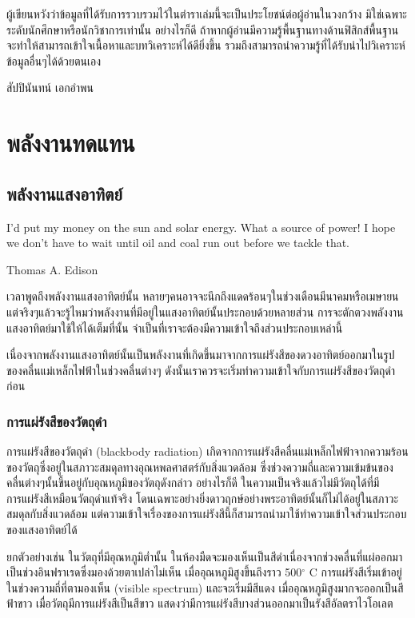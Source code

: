 \documentclass[a4paper,nobib,openany]{tufte-book}
\begin{document}
ผู้เขียนหวังว่าข้อมูลที่ได้รับการรวบรวมไว้ในตำราเล่มนี้จะเป็นประโยชน์ต่อผู้อ่านในวงกว้าง
มิใช่เฉพาะระดับนักศึกษาหรือนักวิชาการเท่านั้น อย่างไรก็ดี
ถ้าหากผู้อ่านมีความรู้พื้นฐานทางด้านฟิสิกส์พื้นฐาน
จะทำให้สามารถเข้าใจเนื้อหาและบทวิเคราะห์ได้ดียิ่งขึ้น
รวมถึงสามารถนำความรู้ที่ได้รับนำไปวิเคราะห์ข้อมูลอื่นๆได้ด้วยตนเอง

สัปปินันทน์ เอกอำพน

\listoffigures

\listoftables

\mainmatter


\part{พลังงานทดแทน}
\label{sec:org705d36b}
\chapter{พลังงานแสงอาทิตย์}
\label{sec:org5cc2bc5}

\epigraph{I'd put my money on the sun and solar energy. What a source of power! I hope we don't have to wait until oil and coal run out before we tackle that.}{Thomas A. Edison}

เวลาพูดถึงพลังงานแสงอาทิตย์นั้น
หลายๆคนอาจจะนึกถึงแดดร้อนๆในช่วงเดือนมีนาคมหรือเมษายน
แต่จริงๆแล้วจะรู้ไหมว่าพลังงานที่มีอยู่ในแสงอาทิตย์นั้นประกอบด้วยหลายส่วน
การจะตักตวงพลังงานแสงอาทิตย์มาใช้ให้ได้เต็มที่นั้น
จำเป็นที่เราจะต้องมีความเข้าใจถึงส่วนประกอบเหล่านี้

เนื่องจากพลังงานแสงอาทิตย์นั้นเป็นพลังงานที่เกิดขึ้นมาจากการแผ่รังสีของดวงอาทิตย์ออกมาในรูปของคลื่นแม่เหล็กไฟฟ้าในช่วงคลื่นต่างๆ
ดังนั้นเราควรจะเริ่มทำความเข้าใจกับการแผ่รังสีของวัตถุดำก่อน

\section{การแผ่รังสีของวัตถุดำ}
\label{sec:orgad093a3}
การแผ่รังสีของวัตถุดำ (blackbody radiation) เกิดจากการแผ่รังสีคลื่นแม่เหล็กไฟฟ้าจากความร้อนของวัตถุซึ่งอยู่ในสภาวะสมดุลทางอุณหพลศาสตร์กับสิ่งแวดล้อม
ซึ่งช่วงความถี่และความเข้มข้นของคลื่นต่างๆนั้นขึ้นอยู่กับอุณหภูมิของวัตถุดังกล่าว
อย่างไรก็ดี
ในความเป็นจริงแล้วไม่มีวัตถุได้ที่มีการแผ่รังสีเหมือนวัตถุดำแท้จริง
โดนเฉพาะอย่างยิ่งดาวฤกษ์อย่างพระอาทิตย์นั้นก็ไม่ได้อยู่ในสภาวะสมดุลกับสิ่งแวดล้อม
แต่ความเข้าใจเรื่องของการแผ่รังสีนี้ก็สามารถนำมาใช้ทำความเข้าใจส่วนประกอบของแสงอาทิตย์ได้

ยกตัวอย่างเช่น ในวัตถุที่มีอุณหภูมิต่ำนั้น
ในห้องมืดจะมองเห็นเป็นสีดำเนื่องจากช่วงคลื่นที่แผ่ออกมาเป็นช่วงอินฟราเรดซึ่งมองด้วยตาเปล่าไม่เห็น
เมื่ออุณหภูมิสูงขึ้นถึงราว 500\(^{\circ}\) C
การแผ่รังสีเริ่มเข้าอยู่ในช่วงความถี่ที่ตามองเห็น (visible spectrum)
และจะเริ่มมีสีแดง เมื่ออุณหภูมิสูงมากจะออกเป็นสีฟ้าขาว
เมื่อวัตถุมีการแผ่รังสีเป็นสีขาว
แสดงว่ามีการแผ่รังสีบางส่วนออกมาเป็นรังสีอัลตราไวโอเลต
\end{document}
